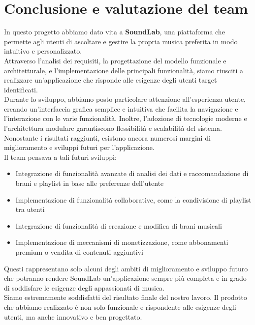 \documentclass{article}
\begin{document}
	\section{Conclusione e valutazione del team}
	In questo progetto abbiamo dato vita a  \textbf{SoundLab}, una piattaforma che permette agli utenti di ascoltare e gestire la propria musica preferita in modo intuitivo e personalizzato.\\
	Attraverso l'analisi dei requisiti, la progettazione del modello funzionale e architetturale, e l'implementazione delle principali funzionalità, siamo riusciti a realizzare un'applicazione che risponde alle esigenze degli utenti target identificati.\\
	Durante lo sviluppo, abbiamo posto particolare attenzione all'esperienza utente, creando un'interfaccia grafica semplice e intuitiva che facilita la navigazione e l'interazione con le varie funzionalità. Inoltre, l'adozione di tecnologie moderne e l'architettura modulare garantiscono flessibilità e scalabilità del sistema.\\
	Nonostante i risultati raggiunti, esistono ancora numerosi margini di miglioramento e sviluppi futuri per l'applicazione.\\
	Il team pensava a tali futuri sviluppi:
	\begin{itemize}
		\item Integrazione di funzionalità avanzate di analisi dei dati e raccomandazione di brani e playlist in base alle preferenze dell'utente
		\item Implementazione di funzionalità collaborative, come la condivisione di playlist tra utenti
		\item Integrazione di funzionalità di creazione e modifica di brani musicali
		\item Implementazione di meccanismi di monetizzazione, come abbonamenti premium o vendita di contenuti aggiuntivi
	\end{itemize}
	Questi rappresentano solo alcuni degli ambiti di miglioramento e sviluppo futuro che potranno rendere SoundLab un'applicazione sempre più completa e in grado di soddisfare le esigenze degli appassionati di musica.
	\\
	Siamo estremamente soddisfatti del risultato finale del nostro lavoro. Il prodotto che abbiamo realizzato è non solo funzionale e rispondente alle esigenze degli utenti, ma anche innovativo e ben progettato.\\
\end{document}

